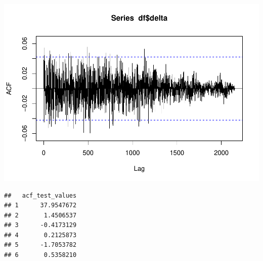 \documentclass[11pt, a4paper]{report}
\newenvironment{Shaded}{\begin{snugshade}}{\end{snugshade}}
\newcommand{\CommentTok}[1]{\textcolor[rgb]{0.56,0.35,0.01}{\textit{#1}}}
\newcommand{\DataTypeTok}[1]{\textcolor[rgb]{0.13,0.29,0.53}{#1}}
\newcommand{\DecValTok}[1]{\textcolor[rgb]{0.00,0.00,0.81}{#1}}
\newcommand{\KeywordTok}[1]{\textcolor[rgb]{0.13,0.29,0.53}{\textbf{#1}}}
\newcommand{\NormalTok}[1]{#1}
\newcommand{\OperatorTok}[1]{\textcolor[rgb]{0.81,0.36,0.00}{\textbf{#1}}}
\newcommand{\StringTok}[1]{\textcolor[rgb]{0.31,0.60,0.02}{#1}}
\theoremstyle{plain}
\theoremstyle{plain}
\theoremstyle{remark}
\begin{document}
\begin{Shaded}
\end{Shaded}

\begin{center}\includegraphics{Econo2_P1_files/figure-latex/plots-4} \end{center}

\begin{Shaded}
\end{Shaded}

\begin{verbatim}
##   acf_test_values
## 1      37.9547672
## 2       1.4506537
## 3      -0.4173129
## 4       0.2125873
## 5      -1.7053782
## 6       0.5358210
\end{verbatim}
\end{document}
